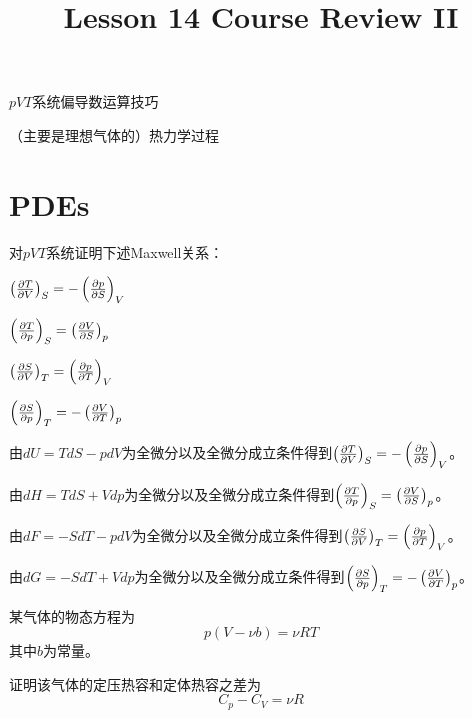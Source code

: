 \documentclass[CJK]{beamer}
\title{Lesson 14 Course Review II}
\author{}
\date{}
\begin{document}



\begin{frame}
  \bch
  \bitem
\item{$pVT$系统偏导数运算技巧}
\item{（主要是理想气体的）热力学过程}
  \eitem
  \ech
\end{frame}

\section{PDEs}

\begin{frame}
  \bch



  \ech
\end{frame}

\begin{frame}
  \bch
  对$pVT$系统证明下述Maxwell关系：
\bitem
\item{$\pfrac TVS = -\pfrac pSV$}
\item{$\pfrac TpS = \pfrac VSp$}
\item{$\pfrac SVT = \pfrac pTV$}
\item{$\pfrac SpT = -\pfrac VTp$}
\eitem

\ech
\end{frame}

\begin{frame}
  \bch
\bitem
\item{由$dU = TdS - pdV$为全微分以及全微分成立条件得到$\pfrac TVS = -\pfrac pSV$。}
\item{由$dH = TdS + Vdp$为全微分以及全微分成立条件得到$\pfrac TpS = \pfrac VSp$。}
\item{由$dF = -SdT - pdV$为全微分以及全微分成立条件得到$\pfrac SVT = \pfrac pTV$。}
\item{由$dG = -SdT + Vdp$为全微分以及全微分成立条件得到$\pfrac SpT = -\pfrac VTp$。}
\eitem
  \ech
\end{frame}

\begin{frame}
  \bch
某气体的物态方程为
$$p(V-\nu b) = \nu R T$$
其中$b$为常量。

证明该气体的定压热容和定体热容之差为
$$ C_p - C_V = \nu R $$

  \ech
\end{frame}
\end{document}
